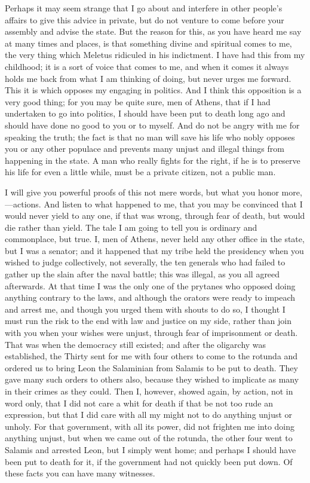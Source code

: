 Perhaps it may seem strange that I go about and interfere in other people's affairs to give this advice in private, but do not venture to come before your assembly and advise the state. But the reason for this, as you have heard me say  at many times and places, is that something divine and spiritual comes to me, the very thing which Meletus ridiculed in his indictment. I have had this from my childhood; it is a sort of voice that comes to me, and when it comes it always holds me back from what I am thinking of doing, but never urges me forward. This it is which opposes my engaging in politics. And I think this opposition is a very good thing; for you may be quite sure, men of Athens, that if I had undertaken to go into politics, I should have been put to death long ago and should have done  no good to you or to myself. And do not be angry with me for speaking the truth; the fact is that no man will save his life who nobly opposes you or any other populace and prevents many unjust and illegal things from happening in the state.  A man who really fights for the right, if he is to preserve his life for even a little while, must be a private citizen, not a public man.

I will give you powerful proofs of this not mere words, but what you honor more,—actions. And listen to what happened to me, that you may be convinced that I would never yield to any one, if that was wrong, through fear of death, but would die rather than yield. The tale I am going to tell you is ordinary and commonplace, but true.  I, men of Athens, never held any other office in the state, but I was a senator; and it happened that my tribe held the presidency when you wished to judge collectively, not severally, the ten generals who had failed to gather up the slain after the naval battle; this was illegal, as you all agreed afterwards. At that time I was the only one of the prytanes who opposed doing anything contrary to the laws, and although the orators were ready to impeach and arrest me, and though you urged them with shouts to do so, I thought  I must run the risk to the end with law and justice on my side, rather than join with you when your wishes were unjust, through fear of imprisonment or death. That was when the democracy still existed; and after the oligarchy was established, the Thirty sent for me with four others to come to the rotunda and ordered us to bring Leon the Salaminian from Salamis to be put to death. They gave many such orders to others also, because they wished to implicate as many in their crimes as they could. Then I, however,  showed again, by action, not in word only, that I did not care a whit for death if that be not too rude an expression, but that I did care with all my might not to do anything unjust or unholy. For that government, with all its power, did not frighten me into doing anything unjust, but when we came out of the rotunda, the other four went to Salamis and arrested Leon, but I simply went home; and perhaps I should have been put to death for it, if the government had not  quickly been put down. Of these facts you can have many witnesses.

